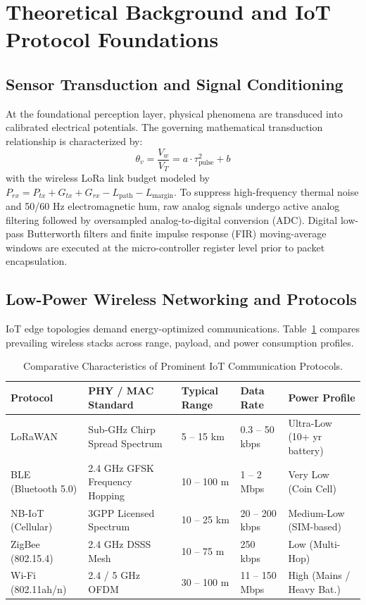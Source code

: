 \section{Theoretical Background and IoT Protocol Foundations}

\subsection{Sensor Transduction and Signal Conditioning}
At the foundational perception layer, physical phenomena are transduced into calibrated electrical potentials. The governing mathematical transduction relationship is characterized by:
\begin{equation}
  \theta_v = \frac{V_w}{V_T} = a \cdot \tau_{\text{pulse}}^2 + b
\label{eq:core_math}
\end{equation}
with the wireless LoRa link budget modeled by $P_{rx} = P_{tx} + G_{tx} + G_{rx} - L_{\text{path}} - L_{\text{margin}}$.
To suppress high-frequency thermal noise and 50/60 Hz electromagnetic hum, raw analog signals undergo active analog filtering followed by oversampled analog-to-digital conversion (ADC). Digital low-pass Butterworth filters and finite impulse response (FIR) moving-average windows are executed at the micro-controller register level prior to packet encapsulation.

\subsection{Low-Power Wireless Networking and Protocols}
IoT edge topologies demand energy-optimized communications. Table~\ref{tab:proto_comp} compares prevailing wireless stacks across range, payload, and power consumption profiles.
\begin{table}[H]
\centering
\caption{Comparative Characteristics of Prominent IoT Communication Protocols.}
\label{tab:proto_comp}
\begin{tabularx}{\linewidth}{lXXXX}
\toprule
\textbf{Protocol} & \textbf{PHY / MAC Standard} & \textbf{Typical Range} & \textbf{Data Rate} & \textbf{Power Profile} \\
\midrule
LoRaWAN & Sub-GHz Chirp Spread Spectrum & 5 -- 15 km & 0.3 -- 50 kbps & Ultra-Low (10+ yr battery) \\
BLE (Bluetooth 5.0) & 2.4 GHz GFSK Frequency Hopping & 10 -- 100 m & 1 -- 2 Mbps & Very Low (Coin Cell) \\
NB-IoT (Cellular) & 3GPP Licensed Spectrum & 10 -- 25 km & 20 -- 200 kbps & Medium-Low (SIM-based) \\
ZigBee (802.15.4) & 2.4 GHz DSSS Mesh & 10 -- 75 m & 250 kbps & Low (Multi-Hop) \\
Wi-Fi (802.11ah/n) & 2.4 / 5 GHz OFDM & 30 -- 100 m & 11 -- 150 Mbps & High (Mains / Heavy Bat.) \\
\bottomrule
\end{tabularx}
\end{table}

